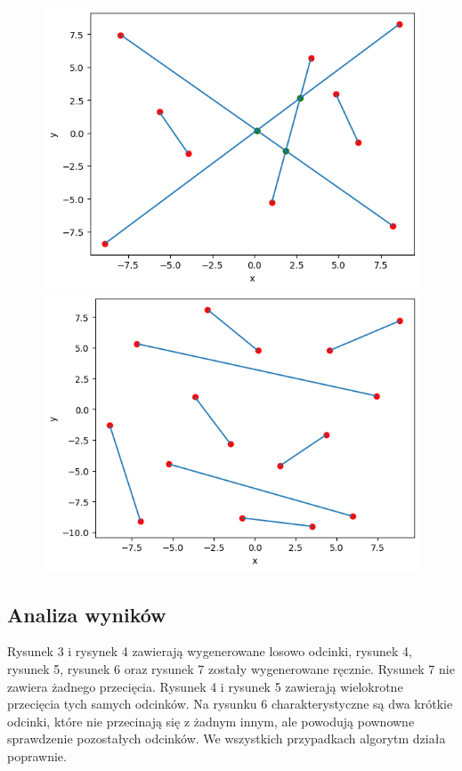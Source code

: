 \documentclass[11pt]{scrartcl}
\begin{document}
    \begin{figure}[H]
        \centering
        \begin{minipage}{0.45\linewidth}
          \centering
          \includegraphics[width=1\linewidth]{4_6.png}
          \caption{}
        \end{minipage}
        \begin{minipage}{0.45\linewidth}
          \centering
          \includegraphics[width=1\linewidth]{4_7.png}
          \caption{}
        \end{minipage}
    \end{figure}

    \subsection{Analiza wyników}
    Rysunek 3 i rysynek 4 zawierają wygenerowane losowo odcinki, rysunek 4, rysunek
    5, rysunek 6 oraz rysunek 7 zostały wygenerowane ręcznie. Rysunek 7 nie zawiera
    żadnego przecięcia. Rysunek 4 i rysunek 5 zawierają wielokrotne przecięcia tych
    samych odcinków. Na rysunku 6 charakterystyczne są dwa krótkie odcinki, które
    nie przecinają się z żadnym innym, ale powodują pownowne sprawdzenie pozostałych
    odcinków. We wszystkich przypadkach algorytm działa poprawnie.
\end{document}

